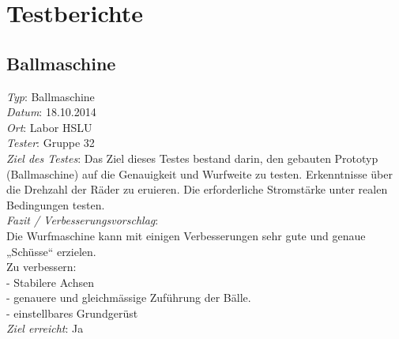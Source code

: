 \section{Testberichte}
\subsection{Ballmaschine}

\textit{Typ}: Ballmaschine \\ 
\textit{Datum}: 18.10.2014   \\
\textit{Ort}: Labor HSLU \\
\textit{Tester}: Gruppe 32 \\
\textit{Ziel des Testes}:  Das Ziel dieses Testes bestand darin, den gebauten Prototyp (Ballmaschine) 
auf die Genauigkeit und Wurfweite zu testen. Erkenntnisse über die 
Drehzahl der Räder zu eruieren. Die erforderliche Stromstärke unter realen 
Bedingungen testen.  \\
\textit{Fazit / Verbesserungsvorschlag}: \\
Die Wurfmaschine kann mit einigen Verbesserungen sehr gute und genaue „Schüsse“ erzielen.  \\
Zu verbessern: \\
- Stabilere Achsen  \\
- genauere und gleichmässige Zuführung der Bälle. \\
- einstellbares Grundgerüst \\
\textit{Ziel erreicht}: Ja
